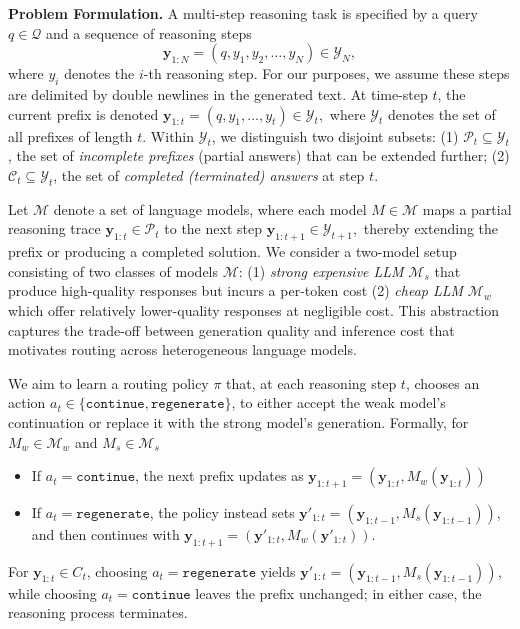 \documentclass{article}
\theoremstyle{plain}
\theoremstyle{definition}
\theoremstyle{remark}
\newcommand{\cont}{\mathtt{continue}}
\newcommand{\regen}{\mathtt{regenerate}}
\newcommand{\M}{\mathcal{M}}
\newcommand{\Y}{\mathcal{Y}}
\newcommand{\y}{\mathbf{y}}
\newcommand{\Pa}{\mathcal{P}}
\begin{document}
\textbf{Problem Formulation.} A multi-step reasoning task is specified by a query $q \in \mathcal{Q}$ and a sequence of reasoning steps
$$
\mathbf{y}_{1:N} = (q, y_1, y_2, \dots, y_N) \in \mathcal{Y}_N,
$$
where $y_i$ denotes the $i$-th reasoning step. For our purposes, we assume these steps are delimited by double newlines in the generated text. At time-step $t$, the current prefix is denoted
$
\mathbf{y}_{1:t} = (q, y_1, \dots, y_t) \in \mathcal{Y}_t,
$
where $\mathcal{Y}_t$ denotes the set of all prefixes of length $t$. 
Within $\mathcal{Y}_t$, we distinguish two disjoint subsets:  
(1) $\mathcal{P}_t \subseteq \mathcal{Y}_t$, the set of \emph{incomplete prefixes} (partial answers) that can be extended further;  
(2) $\mathcal{C}_t \subseteq \mathcal{Y}_t$, the set of \emph{completed (terminated) answers} at step $t$.  


Let $\M$ denote a set of language models, where each model $M \in \M$ maps a partial reasoning trace $\y_{1:t} \in \Pa_t$ to the next step $\y_{1:t+1} \in \Y_{t+1},$ thereby extending the prefix or producing a completed solution.  We consider a two-model setup consisting of two classes of models $\M$: (1) \textit{strong expensive LLM} $\M_s$ that produce high-quality responses but incurs a per-token cost (2) \textit{cheap LLM} $\M_w$ which offer relatively lower-quality responses at negligible cost.  This abstraction captures the trade-off between generation quality and inference cost that motivates routing across heterogeneous language models.

We aim to learn a routing policy $\pi$ that, at each reasoning step $t$, chooses an action $a_t \in \{{\cont, \regen}\}$, to either accept the weak model’s continuation or replace it with the strong model’s generation. Formally, for $M_w \in \mathcal{M}_w$ and $M_s \in \mathcal{M}_s$
\begin{itemize}[leftmargin=*, topsep=0pt, itemsep=0.2em, parsep=0pt, partopsep=0pt]
    \item 
If $a_t = \cont$, the next prefix updates as $\y_{1:t+1} = (\y_{1:t}, M_w(\y_{1:t}))$
\item If $a_t = \regen$, the policy instead sets $\y'_{1:t} = (\y_{1:t-1}, M_s(\y_{1:t-1}))$, and then continues with $\y_{1:t+1} = (\y'_{1:t}, M_w(\y'_{1:t}))$.  
\end{itemize}
For $\y_{1:t} \in C_t$, choosing $a_t = \regen$ yields $\y'_{1:t} = (\y_{1:t-1}, M_s(\y_{1:t-1}))$, while choosing $a_t = \cont$ leaves the prefix unchanged; in either case, the reasoning process terminates.
\end{document}
